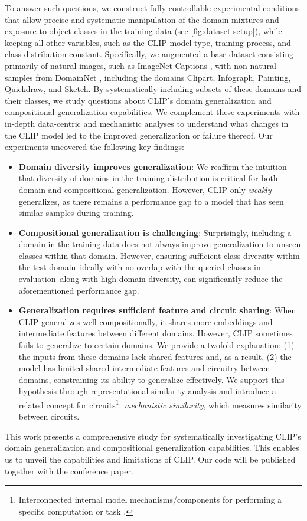To answer such questions, we construct fully controllable experimental conditions that allow precise and systematic manipulation of the domain mixtures and exposure to object classes in the training data (see \cref{fig:dataset-setup}), while keeping all other variables, such as the CLIP model type, training process, and class distribution constant. Specifically, we augmented a base dataset consisting primarily of natural images, such as ImageNet-Captions \citep{fang2022data}, with non-natural samples from DomainNet \citep{peng2019moment}, including the domains Clipart, Infograph, Painting, Quickdraw, and Sketch. By systematically including subsets of these domains and their classes, we study questions about CLIP's domain generalization and compositional generalization capabilities. We complement these experiments with in-depth data-centric and mechanistic analyses to understand what changes in the CLIP model led to the improved generalization or failure thereof. Our experiments uncovered the following key findings:
\begin{itemize}[topsep=1pt]
    \itemsep0pt
    \item \textbf{Domain diversity improves generalization}: We reaffirm the intuition that diversity of domains in the training distribution is critical for both domain and compositional generalization. However, CLIP only \emph{weakly} generalizes, as there remains a performance gap to a model that has seen similar samples during training.
    \item \textbf{Compositional generalization is challenging}: Surprisingly, including a domain in the training data does not always improve generalization to unseen classes within that domain. However, ensuring sufficient class diversity within the test domain--ideally with no overlap with the queried classes in evaluation--along with high domain diversity, can significantly reduce the aforementioned performance gap.
    \item \textbf{Generalization requires sufficient feature and circuit sharing}: When CLIP generalizes well compositionally, it shares more embeddings and intermediate features between different domains. However, CLIP sometimes fails to generalize to certain domains. We provide a twofold explanation: (1) the inputs from these domains lack shared features and, as a result, (2) the model has limited shared intermediate features and circuitry between domains, constraining its ability to generalize effectively. We support this hypothesis through representational similarity analysis and introduce a related concept for circuits\footnote{Interconnected internal model mechanisms/components for performing a specific computation or task \citep{olah2020zoom}.}: \emph{mechanistic similarity}, which measures similarity between circuits.
\end{itemize}
This work presents a comprehensive study for systematically investigating CLIP's domain generalization and compositional generalization capabilities. This enables us to unveil the capabilities and limitations of CLIP. Our code will be published together with the conference paper.
